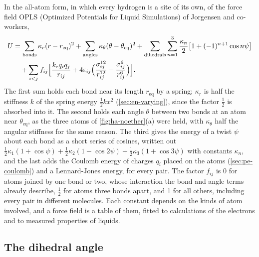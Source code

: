 In the all-atom form, in which every hydrogen is a site of its own, of
the force field OPLS (Optimized Potentials for Liquid Simulations) of
Jorgensen and co-workers\cite{Jorgensen1996},
\begin{equation}
   \begin{aligned}
   U &= \sum_{\text{bonds}}\kappa_r(r - r_{\mathrm{eq}})^2
   + \sum_{\text{angles}}\kappa_\theta(\theta - \theta_{\mathrm{eq}})^2
   + \sum_{\text{dihedrals}}\sum_{n=1}^{3}\frac{\kappa_n}{2}\bigl[1 + (-1)^{n+1}
   \cos n\psi\bigr]\\
   &\quad + \sum_{i<j}f_{ij}\Bigl[\frac{k_{\mathrm e}q_iq_j}{r_{ij}}
   + 4\varepsilon_{ij}\Bigl(\frac{\sigma_{ij}^{12}}{r_{ij}^{12}}
   - \frac{\sigma_{ij}^6}{r_{ij}^6}\Bigr)\Bigr] .
   \end{aligned}
   \label{eq:pe-opls}
\end{equation}
The first sum holds each bond near its length $r_{\mathrm{eq}}$ by a
spring; $\kappa_r$ is half the stiffness $k$ of the spring energy $\frac12
kx^2$ (\cref{sec:en-varying}), since the factor $\frac12$ is absorbed into
it. The second holds each angle
$\theta$ between two bonds at an atom near $\theta_{\mathrm{eq}}$, as the
three atoms of \cref{fig:ha-noether}(a) were held, with $\kappa_\theta$
half the angular stiffness for the same reason. The third gives the
energy of a twist $\psi$ about each bond as a short series of cosines,
written out $\frac12\kappa_1(1 + \cos\psi) + \frac12\kappa_2(1 - \cos2\psi)
+ \frac12\kappa_3(1 + \cos3\psi)$ with constants $\kappa_n$, and
the last adds the Coulomb energy of charges $q_i$ placed on the atoms
(\cref{sec:pe-coulomb}) and a Lennard-Jones energy, for every pair. The
factor $f_{ij}$ is 0 for atoms joined by one bond or two, whose
interaction the bond and angle terms already describe, $\frac12$ for
atoms three bonds apart, and 1 for all others, including every pair in
different molecules. Each constant depends on the kinds of atom involved,
and a force field is a table of them, fitted to calculations of the
electrons and to measured properties of liquids.

\subsection*{The dihedral angle}

